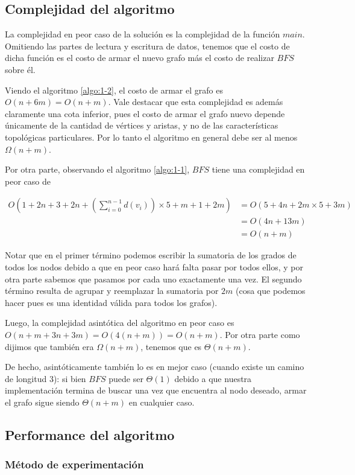 \subsection{Complejidad del algoritmo}
La complejidad en peor caso de la solución es la complejidad de la función $main$. Omitiendo las partes de lectura y escritura de datos, tenemos que el costo de dicha función es el costo de armar el nuevo grafo más el costo de realizar $BFS$ sobre él.

Viendo el algoritmo \ref{algo:1-2}, el costo de armar el grafo es $O(n+6m) = O(n+m)$. Vale destacar que esta complejidad es además claramente una cota inferior, pues el costo de armar el grafo nuevo depende únicamente de la cantidad de vértices y aristas, y no de las características topológicas particulares. Por lo tanto el algoritmo en general debe ser al menos $\Omega(n+m)$.

Por otra parte, observando el algoritmo \ref{algo:1-1}, $BFS$ tiene una complejidad en peor caso de 

\begin{equation}
\begin{aligned}
	O(1+2n+3+2n+(\sum_{i=0}^{n-1}d(v_{i}))\times 5 + m + 1 + 2m) & = O(5+4n+2m\times 5 + 3m) \\
	&= O(4n+13m) \\
	&= O(n+m)
\end{aligned}
\end{equation}

Notar que en el primer término podemos escribir la sumatoria de los grados de todos los nodos debido a que en peor caso hará falta pasar por todos ellos, y por otra parte sabemos que pasamos por cada uno exactamente una vez. El segundo término resulta de agrupar y reemplazar la sumatoria por $2m$ (cosa que podemos hacer pues es una identidad válida para todos los grafos).

Luego, la complejidad asintótica del algoritmo en peor caso es $O(n+m+3n+3m) = O(4(n+m)) = O(n+m)$. Por otra parte como dijimos que también era $\Omega(n+m)$, tenemos que es $\Theta(n+m)$.

De hecho, asintóticamente también lo es en mejor caso (cuando existe un camino de longitud 3): si bien $BFS$ puede ser $\Theta(1)$ debido a que nuestra implementación termina de buscar una vez que encuentra al nodo deseado, armar el grafo sigue siendo $\Theta(n+m)$ en cualquier caso.

\subsection{Performance del algoritmo}

\subsubsection{M\'etodo de experimentación}